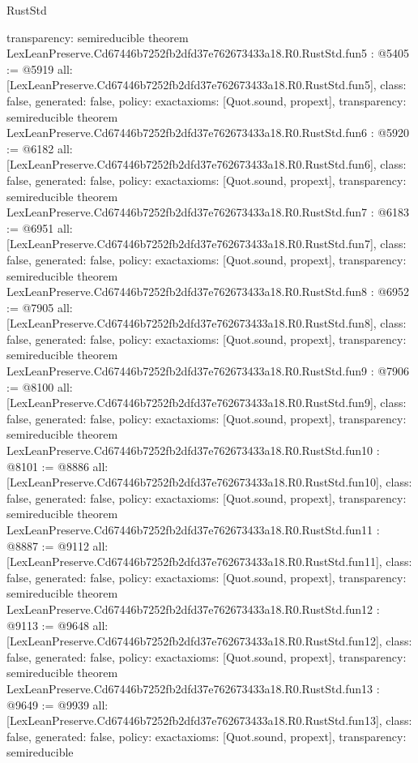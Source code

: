 \begin{lexlean}{RustStd}
\begin{coremodule}
{  transparency: semireducible
}
theorem LexLeanPreserve.Cd67446b7252fb2dfd37e762673433a18.R0.RustStd.fun5 : @5405 := @5919 {
  all: [LexLeanPreserve.Cd67446b7252fb2dfd37e762673433a18.R0.RustStd.fun5],
  class: false,
  generated: false,
  policy: exact{axioms: [Quot.sound, propext]},
  transparency: semireducible
}
theorem LexLeanPreserve.Cd67446b7252fb2dfd37e762673433a18.R0.RustStd.fun6 : @5920 := @6182 {
  all: [LexLeanPreserve.Cd67446b7252fb2dfd37e762673433a18.R0.RustStd.fun6],
  class: false,
  generated: false,
  policy: exact{axioms: [Quot.sound, propext]},
  transparency: semireducible
}
theorem LexLeanPreserve.Cd67446b7252fb2dfd37e762673433a18.R0.RustStd.fun7 : @6183 := @6951 {
  all: [LexLeanPreserve.Cd67446b7252fb2dfd37e762673433a18.R0.RustStd.fun7],
  class: false,
  generated: false,
  policy: exact{axioms: [Quot.sound, propext]},
  transparency: semireducible
}
theorem LexLeanPreserve.Cd67446b7252fb2dfd37e762673433a18.R0.RustStd.fun8 : @6952 := @7905 {
  all: [LexLeanPreserve.Cd67446b7252fb2dfd37e762673433a18.R0.RustStd.fun8],
  class: false,
  generated: false,
  policy: exact{axioms: [Quot.sound, propext]},
  transparency: semireducible
}
theorem LexLeanPreserve.Cd67446b7252fb2dfd37e762673433a18.R0.RustStd.fun9 : @7906 := @8100 {
  all: [LexLeanPreserve.Cd67446b7252fb2dfd37e762673433a18.R0.RustStd.fun9],
  class: false,
  generated: false,
  policy: exact{axioms: [Quot.sound, propext]},
  transparency: semireducible
}
theorem LexLeanPreserve.Cd67446b7252fb2dfd37e762673433a18.R0.RustStd.fun10 : @8101 := @8886 {
  all: [LexLeanPreserve.Cd67446b7252fb2dfd37e762673433a18.R0.RustStd.fun10],
  class: false,
  generated: false,
  policy: exact{axioms: [Quot.sound, propext]},
  transparency: semireducible
}
theorem LexLeanPreserve.Cd67446b7252fb2dfd37e762673433a18.R0.RustStd.fun11 : @8887 := @9112 {
  all: [LexLeanPreserve.Cd67446b7252fb2dfd37e762673433a18.R0.RustStd.fun11],
  class: false,
  generated: false,
  policy: exact{axioms: [Quot.sound, propext]},
  transparency: semireducible
}
theorem LexLeanPreserve.Cd67446b7252fb2dfd37e762673433a18.R0.RustStd.fun12 : @9113 := @9648 {
  all: [LexLeanPreserve.Cd67446b7252fb2dfd37e762673433a18.R0.RustStd.fun12],
  class: false,
  generated: false,
  policy: exact{axioms: [Quot.sound, propext]},
  transparency: semireducible
}
theorem LexLeanPreserve.Cd67446b7252fb2dfd37e762673433a18.R0.RustStd.fun13 : @9649 := @9939 {
  all: [LexLeanPreserve.Cd67446b7252fb2dfd37e762673433a18.R0.RustStd.fun13],
  class: false,
  generated: false,
  policy: exact{axioms: [Quot.sound, propext]},
  transparency: semireducible
}
\end{coremodule}
\end{lexlean}
